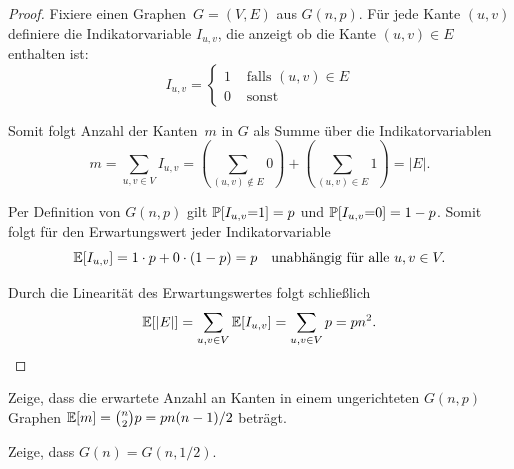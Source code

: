 \begin{proof}
    Fixiere einen Graphen~$G=(V,E)$ aus $G(n,p)$.
    Für jede Kante $(u,v)$ definiere die Indikatorvariable $I_{u,v}$, die anzeigt ob die Kante $(u,v) \in E$ enthalten ist:
    \begin{equation}
        I_{u,v} = \begin{cases}
            1 & \text{ falls } (u,v) \in E \\
            0 & \text{ sonst }
        \end{cases}
    \end{equation}

    \noindent Somit folgt Anzahl der Kanten~$m$ in $G$ als Summe über die Indikatorvariablen
    \begin{equation}
        m = \sum_{u,v \in V} I_{u,v} = \left(\sum_{(u,v) \not\in E} 0 \right) +  \left(\sum_{(u,v) \in E} 1\right) = |E|.
    \end{equation}

    \noindent Per Definition von $G(n, p)$ gilt $\mathbb{P}\!\left[I_{u,v} {=} 1\right] = p$ und $\mathbb{P}\!\left[I_{u,v} {=} 0\right] = 1-p$.
    Somit folgt für den Erwartungswert jeder Indikatorvariable
    \begin{equation}
        \mathbb{E}\!\left[I_{u,v}\right] = 1 \cdot p + 0 \cdot (1-p) = p \quad \text{unabhängig für alle } u, v \in V.
    \end{equation}

    \noindent Durch die Linearität des Erwartungswertes folgt schließlich
    \begin{equation}
        \mathbb{E}\!\left[|E|\right] = \sum_{u,v \in V} \mathbb{E}\!\left[I_{u,v}\right] = \sum_{u,v \in V} p = p n^2. \qedhere
    \end{equation}
\end{proof}

\begin{exercise}
    Zeige, dass die erwartete Anzahl an Kanten in einem ungerichteten $G(n,p)$ Graphen $\mathbb{E}\!\left[m\right] = \binom{n}{2} p = p n(n-1)/2$ beträgt.
\end{exercise}

\begin{exercise}
    Zeige, dass $G(n) = G(n, 1/2)$.
\end{exercise}

\bigskip

